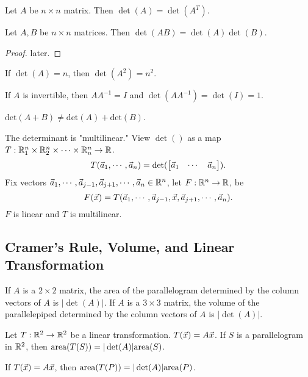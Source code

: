 \documentclass[10pt,a4paper]{article}
\begin{document}
\begin{theorem}
	Let $A$ be $n\times n$ matrix. Then $\det(A) = \det(A^T)$.
\end{theorem}

\begin{theorem}
	Let $A,B$ be $n\times n$ matrices. Then $\det(AB) = \det(A) \det(B)$.
\end{theorem}
\begin{proof}
	later.
\end{proof}
\begin{example}
	If $\det(A) = n$, then $\det(A^2) = n^2$.
\end{example}
\begin{example}
	If $A$ is invertible, then $AA^{-1} = I$ and $\det(AA^{-1}) = \det(I) = 1$.
\end{example}

\begin{remark}
	$\text{det}(A+B) \neq \text{det}(A) + \text{det}(B)$.
\end{remark}

\begin{theorem}
	The determinant is "multilinear." View $\det()$ as a map $T: \mathbb{R}_1^n \times \mathbb{R}_2^n \times \cdots \times \mathbb{R}_n^n \rightarrow \mathbb{R}$. $$T(\vec{a}_1,\cdots,\vec{a}_n) = \det(\begin{bmatrix}\vec{a}_1 &\cdots &\vec{a}_n\end{bmatrix}).$$ Fix vectors $\vec{a}_1,\cdots,\vec{a}_{j-1},\vec{a}_{j+1},\cdots,\vec{a}_n \in \mathbb{R}^n$, let $F: \mathbb{R}^n \rightarrow \mathbb{R}$, be $$F(\vec{x}) = T(\vec{a}_1,\cdots,\vec{a}_{j-1},\vec{x},\vec{a}_{j+1},\cdots,\vec{a}_n).$$
	$F$ is linear and $T$ is multilinear.
\end{theorem}

\subsection{Cramer's Rule, Volume, and Linear Transformation}
\begin{theorem}
	If $A$ is a $2\times 2$ matrix, the area of the parallelogram determined by the column vectors of $A$ is $|\det(A)|$. If $A$ is a $3\times 3$ matrix, the volume of the parallelepiped determined by the column vectors of $A$ is $|\det(A)|$.
\end{theorem}
\begin{theorem}
	Let $T: \mathbb{R}^2 \rightarrow \mathbb{R}^2$ be a linear transformation. $T(\vec{x}) = A\vec{x}$. If $S$ is a parallelogram in $\mathbb{R}^2$, then $\text{area}(T(S)) = |\det(A)| \text{area}(S)$. 
\end{theorem}

If $T(\vec{x}) = A\vec{x}$, then $\text{area}(T(P)) = |\det(A)|\text{area}(P)$.
\end{document}
